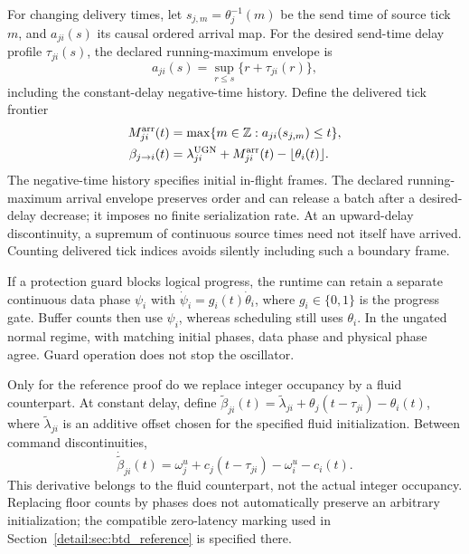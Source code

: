 For changing delivery times, let $s_{j,m}=\theta_j^{-1}(m)$ be the send
time of source tick $m$, and $a_{ji}(s)$ its causal ordered arrival map.
For the desired send-time delay profile $\tau_{ji}(s)$, the declared
running-maximum envelope is
\[
 a_{ji}(s)=\sup_{r\le s}\{r+\tau_{ji}(r)\},
\]
including the constant-delay negative-time history.
Define the delivered tick frontier
\begin{equation}
 \begin{aligned}
 M^{\rm arr}_{ji}(t)&=\max\{m\in\mathbb Z:a_{ji}(s_{j,m})\le t\},\\
 \beta_{j\to i}(t)&=\lambda^{\rm UGN}_{ji}
       +M^{\rm arr}_{ji}(t)-\lfloor\theta_i(t)\rfloor.
 \end{aligned}
 \label{detail:eq:fpd_ordered_arrivals}
\end{equation}
The negative-time history specifies initial in-flight frames. The declared
running-maximum arrival envelope preserves order and can release a batch
after a desired-delay decrease; it imposes no finite serialization rate.
At an upward-delay discontinuity, a supremum of continuous source times
need not itself have arrived. Counting delivered tick indices avoids
silently including such a boundary frame.

If a protection guard blocks logical progress, the runtime can retain a
separate continuous data phase $\psi_i$ with
$\dot\psi_i=g_i(t)\dot\theta_i$, where $g_i\in\{0,1\}$ is the progress
gate. Buffer counts then use $\psi_i$, whereas scheduling still uses
$\theta_i$. In the ungated normal regime, with matching initial phases, data phase and physical phase agree. Guard operation does not stop the oscillator.

Only for the reference proof do we replace integer occupancy by a
fluid counterpart. At constant delay, define
$\widetilde\beta_{ji}(t)=\widetilde\lambda_{ji}
+\theta_j(t-\tau_{ji})-\theta_i(t)$, where
$\widetilde\lambda_{ji}$ is an additive offset chosen for the specified
fluid initialization. Between command discontinuities,
\begin{equation}
 \dot{\widetilde\beta}_{ji}(t)
 =\omega_j^u+c_j(t-\tau_{ji})-\omega_i^u-c_i(t).
 \label{detail:eq:fpi_fluid_counterpart}
\end{equation}
This derivative belongs to the fluid counterpart, not the actual integer
occupancy. Replacing floor counts by phases does not automatically preserve
an arbitrary initialization; the compatible zero-latency marking used in
Section~\ref{detail:sec:btd_reference} is specified there.

